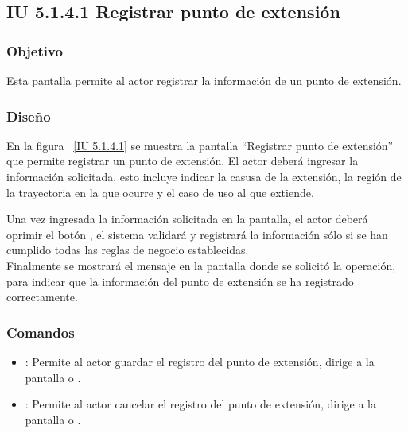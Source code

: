 \subsection{IU 5.1.4.1 Registrar punto de extensión}

\subsubsection{Objetivo}
	
	Esta pantalla permite al actor registrar la información de un punto de extensión.

\subsubsection{Diseño}

    En la figura ~\ref{IU 5.1.4.1} se muestra la pantalla ``Registrar punto de extensión'' que permite registrar un punto de extensión. El actor deberá ingresar la información solicitada, esto incluye indicar la casusa de la extensión, la región de la trayectoria en la que ocurre y el caso de uso al que extiende.
    
    Una vez ingresada la información solicitada en la pantalla, el actor deberá oprimir el botón 
    , el sistema validará y registrará la información sólo si se han cumplido todas las reglas de negocio establecidas.  \\
    
    Finalmente se mostrará el mensaje  en la pantalla donde se solicitó la operación, para indicar que la información del punto de extensión se ha registrado correctamente.        




\subsubsection{Comandos}
\begin{itemize}
	\item {}: Permite al actor guardar el registro del punto de extensión, dirige a la pantalla  o .
	\item {}: Permite al actor cancelar el registro del punto de extensión, dirige a la pantalla  o .
\end{itemize}

